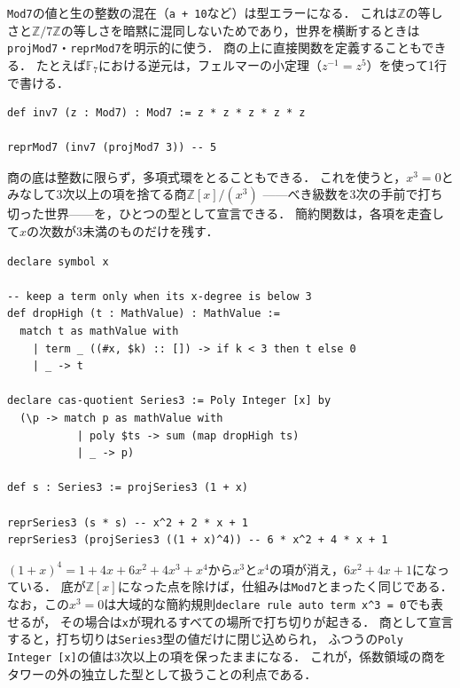 \lstinline{Mod7}の値と生の整数の混在（\lstinline{a + 10}など）は型エラーになる．
これは$\mathbb{Z}$の等しさと$\mathbb{Z}/7\mathbb{Z}$の等しさを暗黙に混同しないためであり，世界を横断するときは\lstinline{projMod7}・\lstinline{reprMod7}を明示的に使う．
商の上に直接関数を定義することもできる．
たとえば$\mathbb{F}_7$における逆元は，フェルマーの小定理（$z^{-1} = z^5$）を使って1行で書ける．
\begin{lstlisting}[language=egison,numbers=none]
def inv7 (z : Mod7) : Mod7 := z * z * z * z * z

reprMod7 (inv7 (projMod7 3)) -- 5
\end{lstlisting}

商の底は整数に限らず，多項式環をとることもできる．
これを使うと，$x^3 = 0$とみなして$3$次以上の項を捨てる商$\mathbb{Z}[x]/(x^3)$
——べき級数を$3$次の手前で打ち切った世界——を，ひとつの型として宣言できる．
簡約関数は，各項を走査して$x$の次数が$3$未満のものだけを残す．
\begin{lstlisting}[language=egison,numbers=none]
declare symbol x

-- keep a term only when its x-degree is below 3
def dropHigh (t : MathValue) : MathValue :=
  match t as mathValue with
    | term _ ((#x, $k) :: []) -> if k < 3 then t else 0
    | _ -> t

declare cas-quotient Series3 := Poly Integer [x] by
  (\p -> match p as mathValue with
           | poly $ts -> sum (map dropHigh ts)
           | _ -> p)

def s : Series3 := projSeries3 (1 + x)

reprSeries3 (s * s) -- x^2 + 2 * x + 1
reprSeries3 (projSeries3 ((1 + x)^4)) -- 6 * x^2 + 4 * x + 1
\end{lstlisting}
$(1 + x)^4 = 1 + 4x + 6x^2 + 4x^3 + x^4$から$x^3$と$x^4$の項が消え，$6x^2 + 4x + 1$になっている．
底が$\mathbb{Z}[x]$になった点を除けば，仕組みは\lstinline{Mod7}とまったく同じである．
なお，この$x^3 = 0$は大域的な簡約規則\lstinline{declare rule auto term x^3 = 0}でも表せるが，
その場合は\lstinline{x}が現れるすべての場所で打ち切りが起きる．
商として宣言すると，打ち切りは\lstinline{Series3}型の値だけに閉じ込められ，
ふつうの\lstinline{Poly Integer [x]}の値は$3$次以上の項を保ったままになる．
これが，係数領域の商をタワーの外の独立した型として扱うことの利点である．

